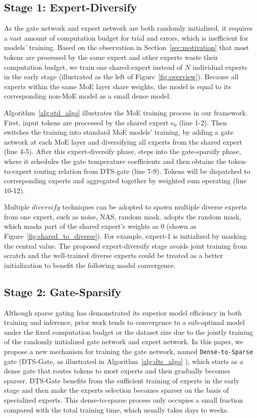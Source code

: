 \subsection{Stage 1: Expert-Diversify}
As the gate network and expert network are both randomly initialized, it requires a vast amount of computation budget for trial and errors, which is inefficient for models' training. Based on the observation in Section~\ref{sec:motivation} that most tokens are processed by the same expert and other experts waste their computation budget, we train one shared-expert instead of $N$ individual experts in the early stage (illustrated as the left of Figure~\ref{fig:overview}). Because all experts within the same MoE layer share weights, the model is equal to its corresponding non-MoE model as a small dense model.

Algorithm~\ref{alg:std_algo} illustrates the MoE training process in our \ourmethods{} framework. First, input tokens are processed by the shared expert $e_{0}$ (line 1-2). Then \ourmethods{} switches the training into standard MoE models' training, by adding a gate network at each MoE layer and diversifying all experts from the shared expert (line 4-5). After this expert-diversify phase, \ourmethods{} steps into the gate-sparsify phase, where it schedules the gate temperature coefficients and then obtains the token-to-expert routing relation from DTS-gate (line 7-9). Tokens will be dispatched to corresponding experts and aggregated together by weighted sum operating (line 10-12).

Multiple $diversify$ techniques can be adopted to spawn multiple diverse experts from one expert, such as noise, NAS, random mask.
\ourmethods{} adopts the random mask, which masks part of the shared expert's weights as 0 (shown as Figure~\ref{fig:shared_to_diverse}). For example, expert-1 is initialized by masking the central value. The proposed expert-diversify stage avoids joint training from scratch and the well-trained diverse experts could be treated as a better initialization to benefit the following model convergence.
 

\subsection{Stage 2: Gate-Sparsify}
Although sparse gating has demonstrated its superior model efficiency in both training and inference, prior work tends to convergence to a sub-optimal model under the fixed computation budget or the dataset size due to the jointly training of the randomly initialized gate network and expert network.   
In this paper, we propose a new mechanism for training the gate network, named \texttt{Dense-to-Sparse} gate (DTS-Gate, as illustrated in Algorithm~\ref{alg:dts_algo} ), which starts as a dense gate that routes tokens to most experts and then gradually becomes sparser. 
DTS-Gate benefits from the sufficient training of experts in the early stage and then make the experts selection becomes sparser on the basis of specialized experts.
This dense-to-sparse process only occupies a small fraction compared with the total training time, which usually takes days to weeks.

